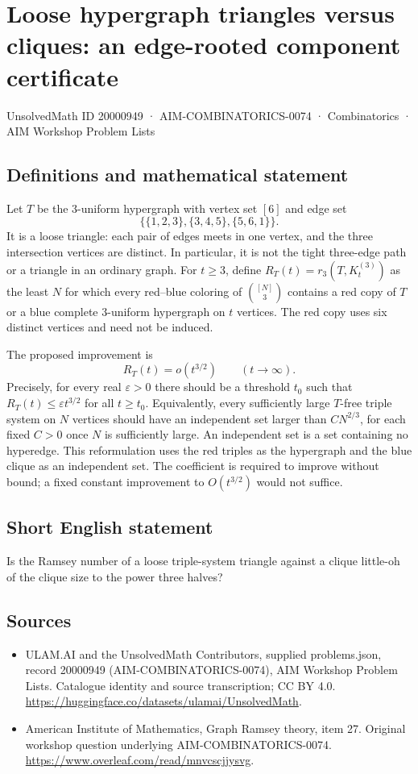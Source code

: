 \documentclass[11pt,a4paper]{article}
\begin{document}
\section*{Loose hypergraph triangles versus cliques: an edge-rooted component certificate}\label{20000949}
{\small UnsolvedMath ID 20000949 · AIM-COMBINATORICS-0074 · Combinatorics · AIM Workshop Problem Lists}
\subsection{Definitions and mathematical statement}
Let $T$ be the $3$-uniform hypergraph with vertex set $[6]$ and edge
set
\[
              \{\{1,2,3\},\{3,4,5\},\{5,6,1\}\}.
\]
It is a loose triangle: each pair of edges meets in one vertex, and
the three intersection vertices are distinct. In particular, it is
not the tight three-edge path or a triangle in an ordinary graph.
For $t\ge3$, define $R_T(t)=r_3(T,K_t^{(3)})$ as the least $N$ for
which every red--blue coloring of $\binom{[N]}3$ contains a red copy
of $T$ or a blue complete $3$-uniform hypergraph on $t$ vertices.
The red copy uses six distinct vertices and need not be induced.

The proposed improvement is
\[
                         R_T(t)=o(t^{3/2})\qquad(t\to\infty).
\]
Precisely, for every real $\varepsilon>0$ there should be a threshold
$t_0$ such that $R_T(t)\le\varepsilon t^{3/2}$ for all $t\ge t_0$.
Equivalently, every sufficiently large $T$-free triple system on
$N$ vertices should have an independent set larger than
$C N^{2/3}$, for each fixed $C>0$ once $N$ is sufficiently large.
An independent set is a set containing no hyperedge. This reformulation
uses the red triples as the hypergraph and the blue clique as an
independent set. The coefficient is required to improve without bound;
a fixed constant improvement to $O(t^{3/2})$ would not suffice.
\subsection{Short English statement}
Is the Ramsey number of a loose triple-system triangle against a clique little-oh of the clique size to the power three halves?
\subsection{Sources}
\begin{itemize}
\item[S1] ULAM.AI and the UnsolvedMath Contributors, supplied problems.json, record 20000949 (AIM-COMBINATORICS-0074), AIM Workshop Problem Lists. Catalogue identity and source transcription; CC BY 4.0.
\url{https://huggingface.co/datasets/ulamai/UnsolvedMath}.
\item[S2] American Institute of Mathematics, Graph Ramsey theory, item 27. Original workshop question underlying AIM-COMBINATORICS-0074.
\url{https://www.overleaf.com/read/mnvcscjjysvg}.
\end{itemize}
\end{document}

